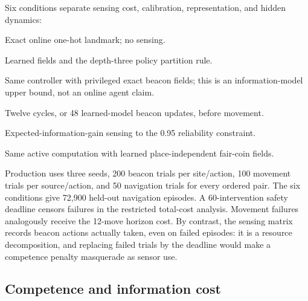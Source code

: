 \documentclass[11pt]{article}
\begin{document}
Six conditions separate sensing cost, calibration, representation, and hidden
dynamics:
\begin{description}[style=nextline]
 \item[Oracle] Exact online one-hot landmark; no sensing.
 \item[Goal-relative active] Learned fields and the depth-three policy
 partition rule.
 \item[Exact-sensor active] Same controller with privileged exact beacon fields;
 this is an information-model upper bound, not an online agent claim.
 \item[Fixed-12] Twelve cycles, or 48 learned-model beacon updates, before
 movement.
 \item[Atlas-preserving active] Expected-information-gain sensing to the 0.95
 reliability constraint.
 \item[Active null] Same active computation with learned place-independent
 fair-coin fields.
\end{description}

Production uses three seeds, 200 beacon trials per site/action, 100 movement
trials per source/action, and 50 navigation trials for every ordered pair. The
six conditions give 72,900 held-out navigation episodes. A 60-intervention
safety deadline censors failures in the restricted total-cost analysis.
Movement failures analogously receive the 12-move horizon cost. By contrast,
the sensing matrix records beacon actions actually taken, even on failed
episodes: it is a resource decomposition, and replacing failed trials by the
deadline would make a competence penalty masquerade as sensor use.

\subsection{Competence and information cost}
\end{document}
